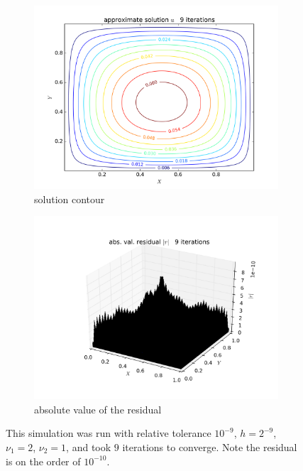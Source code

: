 \documentclass{article} %
\theoremstyle{plain}
\numberwithin{equation}{section} %
\numberwithin{figure}{section} %
\numberwithin{table}{section} %
\begin{document}
\begin{figure}[!htb]
\begin{subfigure}[b]{0.45\textwidth}
        \includegraphics[width=\textwidth]{figures/p1_run2_4.png}
        \caption*{solution contour}
    \end{subfigure}
    \hfill
    \begin{subfigure}[b]{0.45\textwidth}
        \centering
        \includegraphics[width=\textwidth]{figures/p1_run2_3.png}
        \caption*{absolute value of the residual}
    \end{subfigure}
    \caption*{This simulation was run with relative tolerance $10^{-9}$, $h=2^{-9}$, $\nu_1 = 2$, $\nu_2 = 1$, and took $9$ iterations to converge.  Note the residual is on the order of $10^{-10}$.}
\end{figure}
\end{document}
